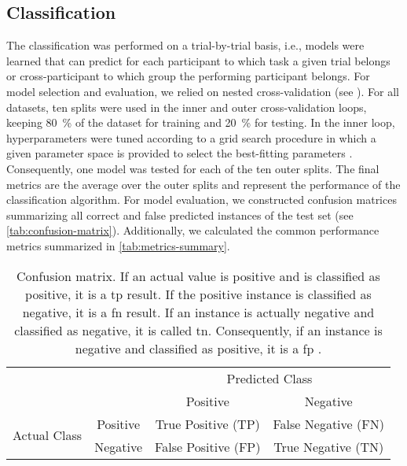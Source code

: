 \subsection{Classification}
The classification was performed on a trial-by-trial basis, i.e., models were learned that can predict for each participant to which task a given trial belongs or cross-participant to which group the performing participant belongs. For model selection and evaluation, we relied on nested cross-validation (see ). For all datasets, ten splits were used in the inner and outer cross-validation loops, keeping 80~\% of the dataset for training and 20~\% for testing. In the inner loop, hyperparameters were tuned according to a grid search procedure in which a given parameter space is provided to select the best-fitting parameters \cite{Varoquaux2017}. Consequently, one model was tested for each of the ten outer splits. The final metrics are the average over the outer splits and represent the performance of the classification algorithm. For model evaluation, we constructed confusion matrices summarizing all correct and false predicted instances of the test set \cite{Fawcett2006} (see \autoref{tab:confusion-matrix}). Additionally, we calculated the common performance metrics summarized in \autoref{tab:metrics-summary}.

\begin{table}[ht]
    \captionsetup{justification=justified, singlelinecheck=false}
    \caption[Confusion matrix]{Confusion matrix. If an actual value is positive and is classified as positive, it is a \gls{tp} result. If the positive instance is classified as negative, it is a \gls{fn} result. If an instance is actually negative and classified as negative, it is called \gls{tn}. Consequently, if an instance is negative and classified as positive, it is a \gls{fp} \cite{Fawcett2006}.}
    \label{tab:confusion-matrix}
    \renewcommand{\arraystretch}{1.25}
    \centering
        \begin{tabular}{cc|c|c|}
            \cline{3-4}
            & & \multicolumn{2}{c|}{Predicted Class} \\ \cline{3-4} 
            & & Positive & Negative \\ \hline
            \multicolumn{1}{|c|}{\multirow{2}{*}{Actual Class}} & Positive & True Positive (TP) & False Negative (FN) \\ \cline{2-4} 
            \multicolumn{1}{|c|}{} & Negative & False Positive (FP) & True Negative (TN) \\ \hline
        \end{tabular}
\end{table}

